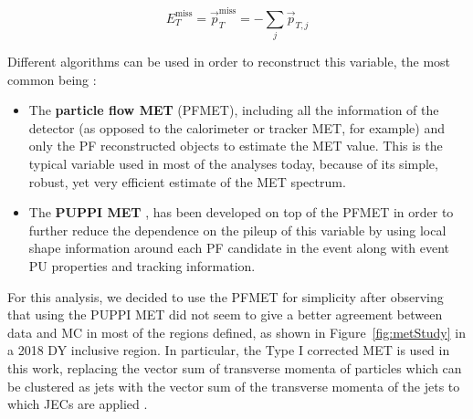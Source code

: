 \documentclass[a4paper, 10pt, openright]{report}
\begin{document}
\begin{equation}
\label{eq:MET}
E_{T}^{\text{miss}} = \overrightarrow{p}_T^{\text{miss}} = - \sum_j \overrightarrow{p}_{T, j}
\end{equation}

Different algorithms can be used in order to reconstruct this variable, the most common being \cite{METReco}:
\begin{itemize}
\item The \textbf{particle flow \ac{MET}} (PFMET), including all the information of the detector (as opposed to the calorimeter or tracker \ac{MET}, for example) and only the \ac{PF} reconstructed objects to estimate the \ac{MET} value. This is the typical variable used in most of the analyses today, because of its simple, robust, yet very efficient estimate of the \ac{MET} spectrum.
\item The \textbf{\ac{PUPPI} \ac{MET}} \cite{PUPPI}, has been developed on top of the PFMET in order to further reduce the dependence on the pileup of this variable by using local shape information around each \ac{PF} candidate in the event along with event \ac{PU} properties and tracking information. %
\end{itemize}

For this analysis, we decided to use the PFMET for simplicity after observing that using the \ac{PUPPI} \ac{MET} did not seem to give a better agreement between data and \ac{MC} in most of the regions defined, as shown in Figure~\ref{fig:metStudy} in a 2018 \ac{DY} inclusive region. In particular, the Type I corrected \ac{MET} is used in this work, replacing the vector sum of transverse momenta of particles which can be clustered as jets with the vector sum of the transverse momenta of the jets to which \acp{JEC} are applied \cite{METTwiki}.
\end{document}
